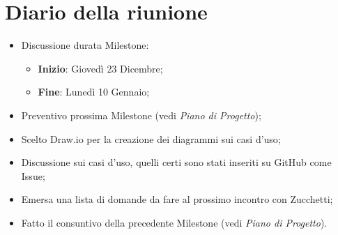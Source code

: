 \section{Diario della riunione}
\begin{itemize}
  \item Discussione durata Milestone:
  \begin{itemize}
    \item \textbf{Inizio}: Giovedì 23 Dicembre;
    \item \textbf{Fine}: Lunedì 10 Gennaio;
  \end{itemize}
  \item Preventivo prossima Milestone (vedi \textit{Piano di Progetto});
  \item Scelto Draw.io per la creazione dei diagrammi sui casi d'uso;
  \item Discussione sui casi d'uso, quelli certi sono stati inseriti su GitHub come Issue;
  \item Emersa una lista di domande da fare al prossimo incontro con Zucchetti;
  \item Fatto il consuntivo della precedente Milestone (vedi \textit{Piano di Progetto}).
\end{itemize}
